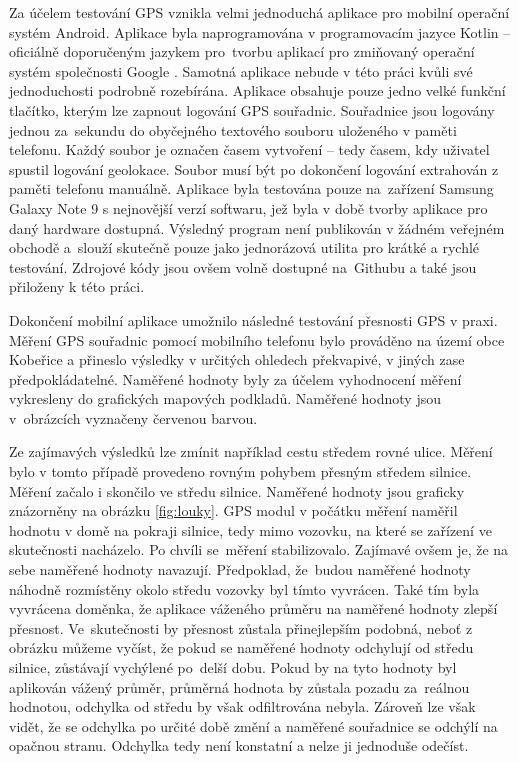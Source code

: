\documentclass[czech, bachelor]{diploma}
\begin{document}
Za účelem testování GPS vznikla velmi jednoduchá aplikace pro mobilní operační systém Android. Aplikace byla naprogramována
v programovacím jazyce Kotlin -- oficiálně doporučeným jazykem pro~tvorbu aplikací pro zmiňovaný operační systém společnosti
Google \cite{kotlin-android-source}. Samotná aplikace nebude v této práci kvůli své jednoduchosti podrobně rozebírána. Aplikace
obsahuje pouze jedno velké funkční tlačítko, kterým lze zapnout logování GPS souřadnic. Souřadnice jsou logovány jednou za~sekundu
do obyčejného textového souboru uloženého v paměti telefonu. Každý soubor je označen časem vytvoření -- tedy časem, kdy uživatel
spustil logování geolokace. Soubor musí být po dokončení logování extrahován z paměti telefonu manuálně. Aplikace byla testována
pouze na~zařízení Samsung Galaxy Note 9 s nejnovější verzí softwaru, jež byla v době tvorby aplikace pro daný hardware dostupná.
Výsledný program není publikován v žádném veřejném obchodě a~slouží skutečně pouze jako jednorázová utilita pro krátké a rychlé
testování. Zdrojové kódy jsou ovšem volně dostupné na~Githubu \cite{geologger-source} a také jsou přiloženy k této práci.

Dokončení mobilní aplikace umožnilo následné testování přesnosti GPS v praxi. Měření GPS souřadnic pomocí mobilního telefonu bylo
prováděno na území obce Kobeřice a přineslo výsledky v určitých ohledech překvapivé, v jiných zase předpokládatelné. Naměřené
hodnoty byly za účelem vyhodnocení měření vykresleny do grafických mapových podkladů. Naměřené hodnoty jsou v~obrázcích vyznačeny
červenou barvou.

Ze zajímavých výsledků lze zmínit například cestu středem rovné ulice. Měření bylo v tomto případě provedeno rovným pohybem
přesným středem silnice. Měření začalo i skončilo ve středu silnice. Naměřené hodnoty jsou graficky znázorněny na obrázku
\ref{fig:louky}. GPS modul v počátku měření naměřil hodnotu v domě na pokraji silnice, tedy mimo vozovku, na které se zařízení
ve skutečnosti nacházelo. Po chvíli se~měření stabilizovalo. Zajímavé ovšem je, že na sebe naměřené hodnoty navazují. Předpoklad,
že~budou naměřené hodnoty náhodně rozmístěny okolo středu vozovky byl tímto vyvrácen. Také tím byla vyvrácena doměnka, že aplikace
váženého průměru na naměřené hodnoty zlepší přesnost. Ve~skutečnosti by přesnost zůstala přinejlepším podobná, neboť z obrázku
můžeme vyčíst, že pokud se naměřené hodnoty odchylují od středu silnice, zůstávají vychýlené po~delší dobu. Pokud by na tyto
hodnoty byl aplikován vážený průměr, průměrná hodnota by zůstala pozadu za~reálnou hodnotou, odchylka od středu by však
odfiltrována nebyla. Zároveň lze však vidět, že se odchylka po určité době změní a naměřené souřadnice se odchýlí na opačnou
stranu. Odchylka tedy není konstatní a nelze ji jednoduše odečíst.
\end{document}
